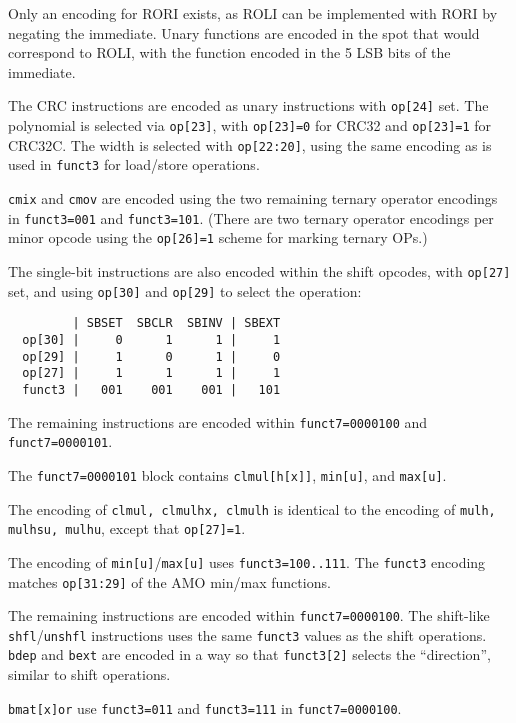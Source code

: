 Only an encoding for RORI exists, as ROLI can be implemented with RORI by negating
the immediate. Unary functions are encoded in the spot that would correspond to ROLI,
with the function encoded in the 5 LSB bits of the immediate.

The CRC instructions are encoded as unary instructions with {\tt op[24]} set. The
polynomial is selected via {\tt op[23]}, with {\tt op[23]=0} for CRC32 and
{\tt op[23]=1} for CRC32C. The width is selected with {\tt op[22:20]}, using
the same encoding as is used in {\tt funct3} for load/store operations.

{\tt cmix} and {\tt cmov} are encoded using the two remaining ternary operator
encodings in {\tt funct3=001} and {\tt funct3=101}. (There are two ternary
operator encodings per minor opcode using the {\tt op[26]=1} scheme for
marking ternary OPs.)

The single-bit instructions are also encoded within the shift opcodes, with
{\tt op[27]} set, and using {\tt op[30]} and {\tt op[29]} to select the operation:

\begin{minipage}{\linewidth}
\begin{verbatim}
         | SBSET  SBCLR  SBINV | SBEXT
  op[30] |     0      1      1 |     1
  op[29] |     1      0      1 |     0
  op[27] |     1      1      1 |     1
  funct3 |   001    001    001 |   101
\end{verbatim}
\end{minipage}

The remaining instructions are encoded within {\tt funct7=0000100} and
{\tt funct7=0000101}.

The {\tt funct7=0000101} block contains {\tt clmul[h[x]]},
{\tt min[u]}, and {\tt max[u]}.

The encoding of {\tt clmul, clmulhx, clmulh} is identical to the encoding of
{\tt mulh, mulhsu, mulhu}, except that {\tt op[27]=1}.

The encoding of {\tt min[u]}/{\tt max[u]} uses {\tt funct3=100..111}. The
{\tt funct3} encoding matches {\tt op[31:29]} of the AMO min/max functions.

The remaining instructions are encoded within {\tt funct7=0000100}. The
shift-like {\tt shfl}/{\tt unshfl} instructions uses the same {\tt funct3}
values as the shift operations. {\tt bdep} and {\tt bext} are encoded in a
way so that {\tt funct3[2]} selects the ``direction'', similar to shift
operations.

{\tt bmat[x]or} use {\tt funct3=011} and {\tt funct3=111} in {\tt funct7=0000100}.

